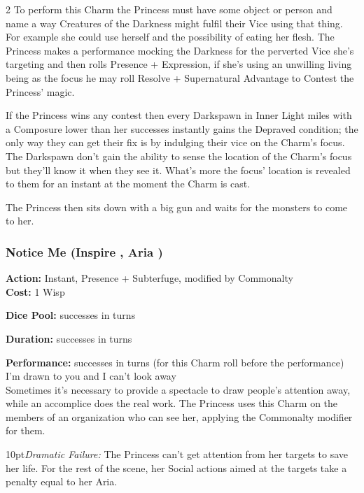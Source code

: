 \begin{multicols}{2}
To perform this Charm the Princess must have some object or person and name a way Creatures of the Darkness might fulfil their Vice using that thing. For example she could use herself and the possibility of eating her flesh. The Princess makes a performance mocking the Darkness for the perverted Vice she's targeting and then rolls Presence + Expression, if she's using an unwilling living being as the focus he may roll Resolve + Supernatural Advantage to Contest the Princess' magic.

If the Princess wins any contest then every Darkspawn in Inner Light miles with a Composure lower than her successes instantly gains the Depraved condition; the only way they can get their fix is by indulging their vice on the Charm's focus. The Darkspawn don't gain the ability to sense the location of the Charm's focus but they'll know it when they see it. What's more the focus' location is revealed to them for an instant at the moment the Charm is cast.

The Princess then sits down with a big gun and waits for the monsters to come to her. 

\subsubsection*{Notice Me (Inspire \textbullet\textbullet\textbullet, Aria \textbullet\textbullet)}
\noindent \textbf{Action:} Instant, Presence + Subterfuge, modified by Commonalty\\

\noindent \textbf{Cost:} 1 Wisp

\noindent \textbf{Dice Pool:} successes in turns

\noindent \textbf{Duration:} successes in turns

\noindent \textbf{Performance:} successes in turns (for this Charm roll before the performance) \\

\noindent I'm drawn to you and I can't look away \\

\noindent Sometimes it's necessary to provide a spectacle to draw people's attention away, while an accomplice does the real work. The Princess uses this Charm on the members of an organization who can see her, applying the Commonalty modifier for them.

\begin{myindentpar}{10pt}\emph{Dramatic Failure:} The Princess can't get attention from her targets to save her life. For the rest of the scene, her Social actions aimed at the targets take a penalty equal to her Aria.


\end{myindentpar}
\end{multicols}
